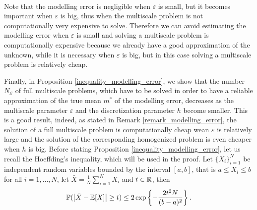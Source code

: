 \documentclass[10pt]{article}
\begin{document}
\begin{remark}
\label{remark_modelling_error}
\leavevmode \\
Note that the modelling error is negligible when $\varepsilon$ is small, but it becomes important when $\varepsilon$ is big, thus when the multiscale problem is not computationally very expensive to solve. Therefore we can avoid estimating the modelling error when $\varepsilon$ is small and solving a multiscale problem is computationally expensive because we already have a good approximation of the unknown, while it is necessary when $\varepsilon$ is big, but in this case solving a multiscale problem is relatively cheap.
\end{remark}

Finally, in Proposition \ref{inequality_modelling_error}, we show that the number $N_{\mathcal{E}}$ of full multiscale problems, which have to be solved in order to have a reliable approximation of the true mean $m^*$ of the modelling error, decreases as the multiscale parameter $\varepsilon$ and the discretization parameter $h$ become smaller. This is a good result, indeed, as stated in Remark \ref{remark_modelling_error}, the solution of a full multiscale problem is computationally cheap wean $\varepsilon$ is relatively large and the solution of the corresponding homogenized problem is even cheaper when $h$ is big. Before stating Proposition \ref{inequality_modelling_error}, let us recall the Hoeffding's inequality, which will be used in the proof. Let $\{ X_i \}_{i=1}^N$ be independent random variables bounded by the interval $[a,b]$, that is $a \le X_i \le b$ for all $i = 1, \dots, N$, let $\bar{X} = \frac{1}{N} \sum_{i=1}^N X_i$ and $t \in \mathbb{R}$, then
\[ \mathbb{P} (\left\lvert\bar{X} - \mathbb{E}[X]\right\rvert \ge t) \le 2 \exp \left \{ - \frac{2 t^2 N}{(b-a)^2} \right \}. \]
\end{document}
